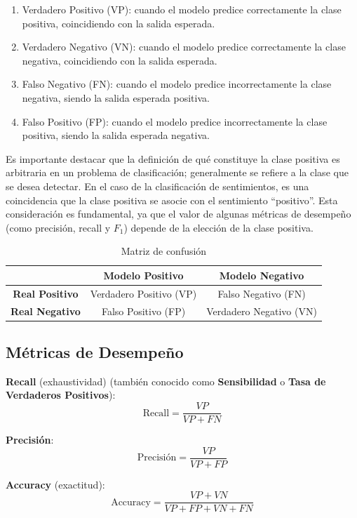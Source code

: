\begin{enumerate}
\item Verdadero Positivo (VP): cuando el modelo predice correctamente la clase positiva, coincidiendo con la salida esperada.
\item Verdadero Negativo (VN): cuando el modelo predice correctamente la clase negativa, coincidiendo con la salida esperada.
\item Falso Negativo (FN): cuando el modelo predice incorrectamente la clase negativa, siendo la salida esperada positiva.
\item Falso Positivo (FP): cuando el modelo predice incorrectamente la clase positiva, siendo la salida esperada negativa.
\end{enumerate}

Es importante destacar que la definición de qué constituye la clase positiva es arbitraria en un problema de clasificación; generalmente se refiere a la clase que se desea detectar. En el caso de la clasificación de sentimientos, es una coincidencia que la clase positiva se asocie con el sentimiento ``positivo''. Esta consideración es fundamental, ya que el valor de algunas métricas de desempeño (como precisión, recall y $F_1$) depende de la elección de la clase positiva.

\begin{table}[htbp]
\centering
\begin{tabular}{|c|c|c|}
\hline
\textbf{} & \textbf{Modelo Positivo} & \textbf{Modelo Negativo} \\
\hline
\textbf{Real Positivo} & Verdadero Positivo (VP) & Falso Negativo (FN) \\
\hline
\textbf{Real Negativo} & Falso Positivo (FP) & Verdadero Negativo (VN) \\
\hline
\end{tabular}
\caption{Matriz de confusión}
\label{tab:matriz_confusion}
\end{table}


\subsection{Métricas de Desempeño}

\textbf{Recall} (exhaustividad) (también conocido como \textbf{Sensibilidad} o \textbf{Tasa de Verdaderos Positivos}):
\[ \text{Recall} = \frac{VP}{VP + FN} \]

\textbf{Precisión}:
\[ \text{Precisión} = \frac{VP}{VP + FP} \]

\textbf{Accuracy} (exactitud):
\[ \text{Accuracy} = \frac{VP + VN}{VP + FP + VN + FN} \]


